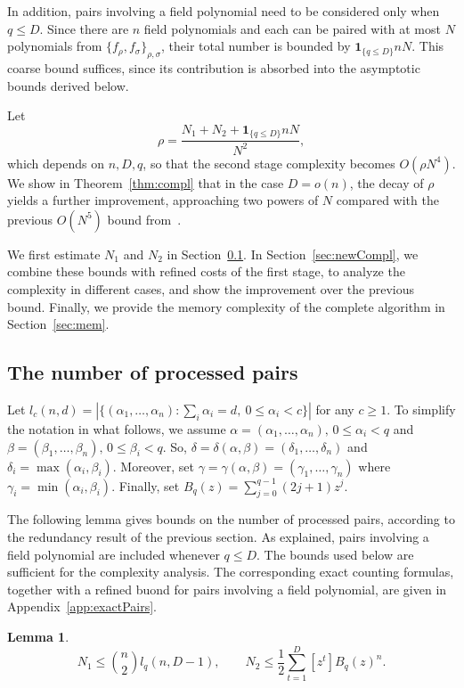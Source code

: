 \documentclass[a4paper, 12pt, oneside, openright]{article}
\newtheorem{lemma}{Lemma}
\begin{document}
In addition, pairs involving a field polynomial need to be considered only when $q\le D$. Since there are $n$ field polynomials and each can be paired with at most $N$ polynomials from $\{f_{\rho},f_\sigma\}_{\rho,\sigma}$, their total number is bounded by $\mathbf{1}_{\{q\le D\}}nN$. This coarse bound suffices, since its contribution is absorbed into the asymptotic bounds derived below.

Let
\[
\rho = \frac{N_1+N_2+\mathbf{1}_{\{q\le D\}}nN}{N^2},
\]
which depends on $n,D,q$, so that the second stage complexity becomes $O\left(\rho N^4\right).$
We show in Theorem~\ref{thm:compl} that in the case $D=o(n)$, the decay of $\rho$ yields a further improvement, approaching two powers of $N$ compared with the previous $O(N^5)$ bound from~\cite{ST}.

We first estimate $N_1$ and $N_2$ in Section~\ref{sec:numPairs}.
In Section~\ref{sec:newCompl}, we combine these bounds with refined costs of the first stage, to analyze the complexity in different cases, and show the improvement over the previous bound. Finally, we provide the memory complexity of the complete algorithm in Section~\ref{sec:mem}.
 
 
\subsection{The number of processed pairs}\label{sec:numPairs}

Let $l_c(n,d)=|\{ (\alpha_1,\dots, \alpha_n): \sum_i \alpha_i =d,\ 0\le \alpha_i <c\}|$ for any $c\geq 1$.
To simplify the notation in what follows, we assume $\alpha=(\alpha_1,\dots,\alpha_n),\, 0\le \alpha_i<q$ and $\beta=(\beta_1,\dots,\beta_n),\, 0\le \beta_i<q$. So, $\delta=\delta(\alpha,\beta)=(\delta_1,\dots,\delta_n)$ and $\delta_i=\max(\alpha_i,\beta_i)$. Moreover, set $\gamma=\gamma(\alpha,\beta)=(\gamma_1,\dots,\gamma_n)$ where $\gamma_i=\min(\alpha_i,\beta_i)$. Finally, set $B_q(z)=\sum_{j=0}^{q-1}(2j+1)z^j.$


The following lemma gives bounds on the number of processed pairs, according to the redundancy result of the previous section. As explained, pairs involving a field polynomial are included whenever $q\le D$.
The bounds used below are sufficient for the complexity analysis. The corresponding exact counting formulas, together with a refined buond for pairs involving a field polynomial, are given in Appendix~\ref{app:exactPairs}.

\begin{lemma}\label{lem:N1N2}
\begin{equation*} N_1\leq 
\binom{n}{2}l_q(n,D-1),
\qquad
N_2\leq\frac{1}{2} \sum_{t=1}^{D}[z^t]B_q(z)^n. \label{eq:boundPair}
\end{equation*}
\end{lemma}
\end{document}
